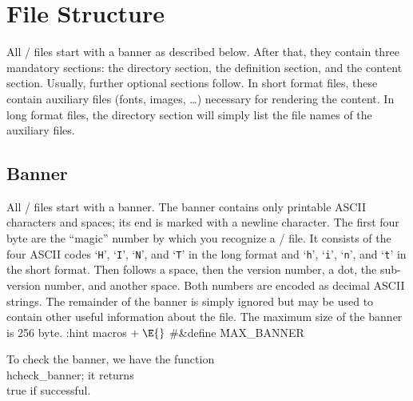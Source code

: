 

\section{File Structure}\hascode
All \HINT/ files start with a banner as
described below.  After that, they contain three mandatory
sections: the directory
section, the definition section, and the
content section.  Usually, further
optional sections follow.  In short format
files, these contain auxiliary files
(fonts, images, \dots) necessary for
rendering the content. In long format files, the directory section
will simply list the file names of the auxiliary files.



\subsection{Banner}
All \HINT/ files start with a banner. The banner contains only
printable ASCII characters and spaces;
its end is marked with a newline character.
The first four byte are the ``magic'' number by which you recognize a \HINT/
file. It consists of the four ASCII codes `{\tt H}', `{\tt I}', `{\tt N}',
and `{\tt T}' in the long format and `{\tt h}', `{\tt i}', `{\tt n}',
and `{\tt t}' in the short format.  Then follows a space, then
the version number, a dot, the sub-version number, and another
space. Both numbers are encoded as decimal ASCII strings.  The
remainder of the banner is simply ignored but may be used to contain
other useful information about the file.  The maximum size of the
banner is 256 byte.
\Y\B\4:hint macros\X${}\mathrel+\E{}$\6
\8\#\&{define} \.{MAX\_BANNER}\5
\Y
\fi


\goodbreak
To check the banner, we have the function \\{hcheck\_banner};
it returns \\{true} if successful.



